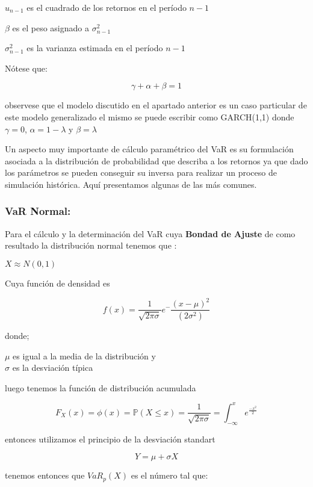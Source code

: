 \documentclass[10pt,]{article}
\begin{document}
\(u_{n-1}\) es el cuadrado de los retornos en el período \(n-1\)

\(\beta\) es el peso asignado a \(\sigma_{n-1}^2\)

\(\sigma_{n-1}^2\) es la varianza estimada en el período \(n-1\)

Nótese que:

\[\gamma + \alpha + \beta = 1\]

observese que el modelo discutido en el apartado anterior es un caso
particular de este modelo generalizado el mismo se puede escribir como
GARCH(1,1) donde \(\gamma=0\), \(\alpha= 1 - \lambda\) y
\(\beta = \lambda\)

Un aspecto muy importante de cálculo paramétrico del VaR es su
formulación asociada a la distribución de probabilidad que describa a
los retornos ya que dado los parámetros se pueden conseguir su inversa
para realizar un proceso de simulación histórica. Aquí presentamos
algunas de las más comunes.

\hypertarget{var-normal}{%
\subsubsection{\texorpdfstring{\textbf{VaR
Normal:}}{VaR Normal:}}\label{var-normal}}

Para el cálculo y la determinación del VaR cuya \textbf{Bondad de
Ajuste} de como resultado la distribución normal tenemos que :

\(X \approx N(0,1)\)

Cuya función de densidad es

\[f(x) = \frac{1}{\sqrt{2 \pi \sigma}} e^-\frac{(x - \mu)^2}{(2 \sigma^2)}\]

donde;

\(\mu\) es igual a la media de la distribución y\\
\(\sigma\) es la desviación típica

luego tenemos la función de distribución acumulada

\[F_{X}(x) = \phi(x) = \mathbb{P}(X \leq x) = \frac{1}{\sqrt{2 \pi \sigma}} = \int_{-\infty}^{x}e^{\frac{-x^2}{2}}\]

entonces utilizamos el principio de la desviación standart

\[Y = \mu + \sigma X\]

tenemos entonces que \(VaR_{p}(X)\) es el número tal que:
\end{document}
